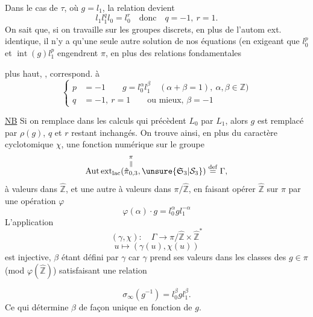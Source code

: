 Dans le cas de $\tau$, où $g=l_1$, la relation devient
\[
l_1l_1^ql_0=l_0^r\quad\text{donc}\quad q=-1,\ r=1.
\]
On sait que, si on travaille sur les groupes discrets, en plus de l'autom ext. identique, il n'y a qu'une seule autre solution de nos équations (en exigeant  que $l_0^p$ et $\operatorname{int}(g)l_1^p$ engendrent $\pi$, en plus des relations fondamentales

plus haut,  , correspond.  à
\[
\left\{\begin{aligned}
p&=-1\qquad g=l_0^\alpha l_1^\beta\quad(\alpha+\beta=1),\ \alpha,\beta\in\mathbb Z)\\
q&=-1,\ r=1\qquad\text{ou mieux, }\beta=-1
\end{aligned}\right.
\]

\uline{NB} Si on remplace dans les calculs qui précèdent $L_0$ par $L_1$, alors $g$ est remplacé par $\rho(g)$, $q$ et $r$ restant inchangés. On trouve ainsi, en plus du caractère cyclotomique $\chi$, une  fonction numérique \inserted{$\beta$} sur le groupe
\[
\operatorname{Aut\,ext}_{\mathrm{lac}}(\overset{\pi}{\overset{\Vert}{\hat\pi_{0,3}}},\unsure{\mathfrak S_3|\mathcal S_3})\overset{\mathrm{def}}=\Gamma,
\]
 à valeurs dans $\hat{\mathbb Z}$, et une autre \inserted{$\gamma$} à valeurs dans $\pi/\hat{\mathbb Z}$, en faisant opérer $\hat{\mathbb Z}$ sur $\pi$ par une opération $\varphi$
\[
\varphi(\alpha)\cdot g=l_0^\alpha gl_1^{-\alpha}
\]
L'application
\[
(\gamma,\chi):\quad\Gamma\longrightarrow\pi/\hat{\mathbb Z}\times\hat{\mathbb Z}^{*}
\]
\[
u\longmapsto(\gamma(u),\chi(u))
\]
est injective,  $\beta$ étant défini par $\gamma$ car $\gamma$ prend ses valeurs dans les classes des $g\in\pi$ (mod $\varphi(\hat{\mathbb Z})$) satisfaisant une relation

\[
\sigma_\infty(g^{-1})=l_0^\beta g l_1^\beta.
\]
Ce qui détermine $\beta$ de façon unique en fonction de $g$.


